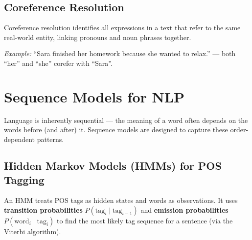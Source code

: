 \documentclass[11pt,a4paper]{article}
\begin{document}
\subsection{Coreference Resolution}
\begin{definitionbox}
Coreference resolution identifies all expressions in a text that refer to the same real-world entity, linking pronouns and noun phrases together.
\end{definitionbox}
\textit{Example:} ``Sara finished her homework because she wanted to relax.'' --- both ``her'' and ``she'' corefer with ``Sara''.

\section{Sequence Models for NLP}

\begin{definitionbox}
Language is inherently sequential --- the meaning of a word often depends on the words before (and after) it. Sequence models are designed to capture these order-dependent patterns.
\end{definitionbox}

\subsection{Hidden Markov Models (HMMs) for POS Tagging}
\begin{conceptbox}
An HMM treats POS tags as hidden states and words as observations. It uses \textbf{transition probabilities} $P(\text{tag}_i \mid \text{tag}_{i-1})$ and \textbf{emission probabilities} $P(\text{word}_i \mid \text{tag}_i)$ to find the most likely tag sequence for a sentence (via the Viterbi algorithm).
\end{conceptbox}

\begin{center}
\end{center}
\end{document}
